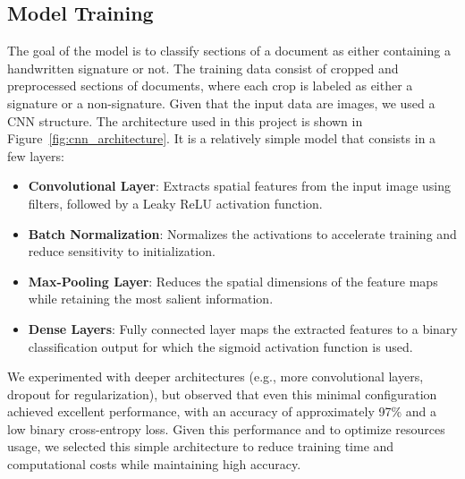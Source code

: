 \documentclass[a4paper,12pt]{article}
\begin{document}
\subsection{Model Training}

The goal of the model is to classify sections of a document as either containing a handwritten signature or not. The training data consist of cropped and preprocessed sections of documents, where each crop is labeled as either a signature or a non-signature.
Given that the input data are images, we used a CNN structure.
The architecture used in this project is shown in Figure~\ref{fig:cnn_architecture}. It is a relatively simple model that consists in a few layers: \begin{itemize} \item \textbf{Convolutional Layer}: Extracts spatial features from the input image using filters, followed by a Leaky ReLU activation function. \item \textbf{Batch Normalization}: Normalizes the activations to accelerate training and reduce sensitivity to initialization. \item \textbf{Max-Pooling Layer}: Reduces the spatial dimensions of the feature maps while retaining the most salient information. \item \textbf{Dense Layers}: Fully connected layer maps the extracted features to a binary classification output for which the sigmoid activation function is used. \end{itemize}

We experimented with deeper architectures (e.g., more convolutional layers, dropout for regularization), but observed that even this minimal configuration achieved excellent performance, with an accuracy of approximately 97\% and a low binary cross-entropy loss. Given this performance and to optimize resources usage, we selected this simple architecture to reduce training time and computational costs while maintaining high accuracy.
\end{document}
